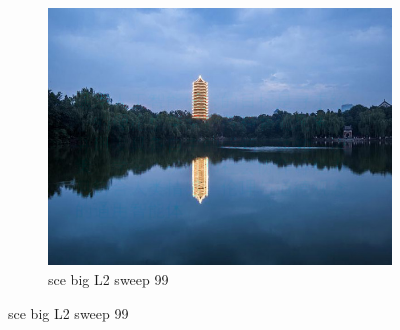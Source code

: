 \documentclass[11pt]{article}
\begin{document}
\begin{figure}[ht!]
\begin{subfigure}[]{0.333\linewidth}
        \centering
        \includegraphics[width=\linewidth]{fig/restoration/sce_big/L2/gibbs_99.jpg}
        \caption{sce big L2 sweep 99}
    \end{subfigure}%
\end{figure}
\end{document}
